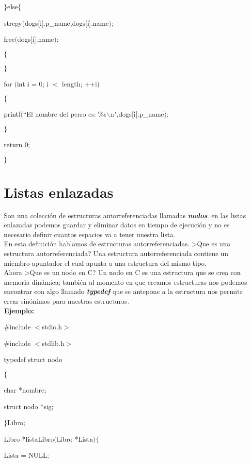 \documentclass[]{article}
\begin{document}
	$\rbrace$else$\lbrace$
	
	strcpy$($dogs$[$i$]$.p\_name,dogs$[$i$]$.name$)$;
	
	free$($dogs$[$i$]$.name$)$;
	
	$\lbrace$
	
	$\rbrace$
	
	for $($int i = 0; i $<$ length; ++i$)$
	
	$\lbrace$
	
	printf$($``El nombre del perro es: \%s$\backslash$n",dogs$[$i$]$.p\_name$)$;
	
	$\rbrace$
	
	return 0;
	
	$\rbrace$
	
	\section{Listas enlazadas}
	
	Son una colección de estructuras autorreferenciadas llamadas \textit{\textbf{nodos}}. en las listas enlazadas podemos guardar y eliminar datos en tiempo de ejecución y no es necesario definir cuantos espacios va a tener nuestra lista.\\
	
	En esta definición hablamos de estructuras autorreferenciadas. >Que es una estructura autorreferenciada? Una estructura autorreferenciada contiene un miembro apuntador el cual apunta a una estructura del mismo tipo.\\
	
	Ahora >Que es un nodo en C? Un nodo en C es una estructura que se crea con memoria dinámica; también al momento en que creamos estructuras nos podemos encontrar con algo llamado \textit{\textbf{typedef}} que se antepone a la estructura nos permite crear sinónimos para nuestras estructuras.\\
	
	\textbf{Ejemplo:}
	
	\#include $<$stdio.h$>$
	
	\#include $<$stdlib.h$>$
	
	typedef struct nodo
	
	$\lbrace$
	
	char *nombre;
	
	struct nodo *sig;
	
	$\rbrace$Libro;
	
	Libro *listaLibro$($Libro *Lista$)$$\lbrace$
	
	Lista = NULL;
	
\end{document}

